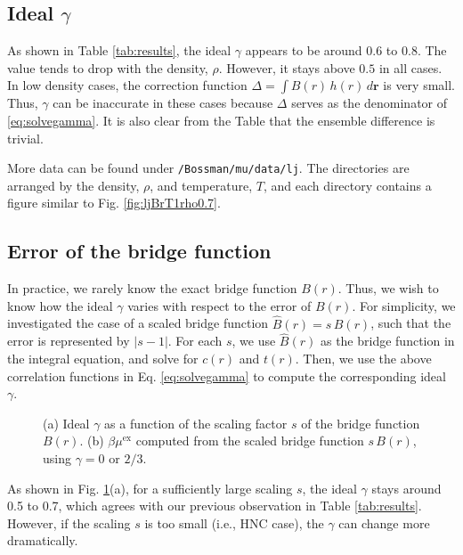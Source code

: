\documentclass[preprint]{revtex4-1}
\newcommand{\vct}[1]{\mathbf{#1}}
\providecommand{\vr}{} %
\renewcommand{\vr}{\vct{r}}
\newcommand{\supex}[1]{ { { #1 }^{ \mathrm{ex} } } }
\newcommand{\muex}{\supex{\mu}}
\begin{document}
\subsection{Ideal $\gamma$}

As shown in Table \ref{tab:results},
the ideal $\gamma$ appears to be around $0.6$ to $0.8$.
%
The value tends to drop with the density, $\rho$.
However, it stays above $0.5$ in all cases.
%
In low density cases,
the correction function $\Delta =\int B(r) \, h(r) \, d\vr$
is very small.
%
Thus, $\gamma$ can be inaccurate in these cases
because $\Delta$ serves as the denominator of \eqref{eq:solvegamma}.
%
It is also clear from the Table that the ensemble difference is trivial.

More data can be found under \texttt{/Bossman/mu/data/lj}.
%
The directories are arranged by the density, $\rho$,
and temperature, $T$,
and each directory contains a figure similar to Fig. \ref{fig:ljBrT1rho0.7}.
%
%


\subsection{Error of the bridge function}

In practice, we rarely know the exact bridge function $B(r)$.
%
Thus, we wish to know how the ideal $\gamma$ varies
with respect to the error of $B(r)$.
%
For simplicity,
we investigated the case of a scaled bridge function $\hat B(r) = s \, B(r)$,
%
such that the error is represented by $|s - 1|$.
%
For each $s$,
we use $\hat B(r)$ as the bridge function in the integral equation,
and solve for $c(r)$ and $t(r)$.
%
Then, we use the above correlation functions in Eq. \eqref{eq:solvegamma}
to compute the corresponding ideal $\gamma$.

\begin{figure}[h]
  \caption{
    \label{fig:Bscale}
    (a) Ideal $\gamma$ as a function of the scaling factor $s$ of the bridge function $B(r)$.
    (b) $\beta \muex$ computed from the scaled bridge function $s \, B(r)$, using $\gamma = 0$ or $2/3$.
  }
\end{figure}


As shown in Fig. \ref{fig:Bscale}(a),
for a sufficiently large scaling $s$,
the ideal $\gamma$ stays around 0.5 to 0.7,
which agrees with our previous observation in Table \ref{tab:results}.
%
However, if the scaling $s$ is too small (i.e., HNC case),
the $\gamma$ can change more dramatically.
\end{document}

